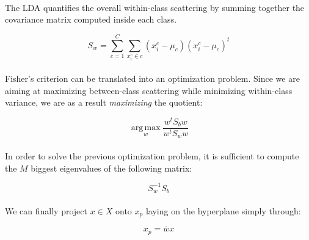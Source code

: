 \paragraph{}
The LDA quantifies the overall within-class scattering by summing together the covariance matrix
computed inside each class.

\begin{equation*}
S_w = \sum_{c = 1}^{C}\sum_{x^c_i \in c} (x^c_i - \mu_c)(x^c_i - \mu_c)^t
\end{equation*}

\paragraph{}
Fisher's criterion can be translated into an optimization problem. Since we are aiming at maximizing
between-class scattering while minimizing within-class variance, we are as a result
\emph{maximizing} the quotient:

\begin{equation}
\boxed{\operatorname*{arg\,max}_w \frac{w^tS_bw}{w^tS_ww}}
\label{eq:maximize}
\end{equation}

\paragraph{}
In order to solve the previous optimization problem, it is sufficient to compute the $M$ biggest
eigenvalues of the following matrix:

\begin{equation*}
S_w^{-1}S_b
\end{equation*}

\paragraph{}
We can finally project $x \in X$ onto $x_p$ laying on the hyperplane simply through:

\begin{equation*}
x_p = \bar{w}x
\end{equation*}
